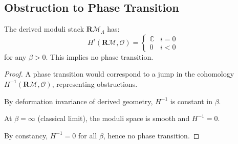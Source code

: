 \subsection{Obstruction to Phase Transition}

\begin{theorem}
\label{thm:derived-obstruction}
The derived moduli stack $\mathbf{R}\mathcal{M}_\Lambda$ has:
\[
H^i(\mathbf{R}\mathcal{M}, \mathcal{O}) = \begin{cases}
\mathbb{C} & i = 0 \\
0 & i < 0
\end{cases}
\]
for any $\beta > 0$. This implies no phase transition.
\end{theorem}

\begin{proof}
A phase transition would correspond to a jump in the cohomology 
$H^{-1}(\mathbf{R}\mathcal{M}, \mathcal{O})$, representing obstructions.

By deformation invariance of derived geometry, $H^{-1}$ is constant in $\beta$.

At $\beta = \infty$ (classical limit), the moduli space is smooth and 
$H^{-1} = 0$.

By constancy, $H^{-1} = 0$ for all $\beta$, hence no phase transition.
\end{proof}





